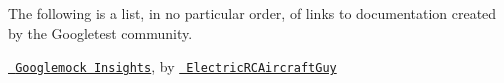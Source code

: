 The following is a list, in no particular order, of links to documentation created by the Googletest community.


\begin{DoxyItemize}
\item \href{https://github.com/ElectricRCAircraftGuy/eRCaGuy_dotfiles/blob/master/googletest/insights.md}{\texttt{ Googlemock Insights}}, by \href{https://github.com/ElectricRCAircraftGuy}{\texttt{ Electric\+RCAircraft\+Guy}} 
\end{DoxyItemize}